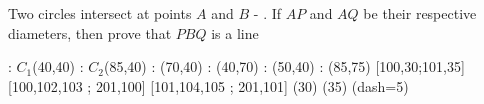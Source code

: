 
%
%
%
%
% 
% 

\question Two circles intersect at points $A$ and $B$ - \asif. If $AP$ and $AQ$ be their 
respective diameters, then prove that $PBQ$ is a line

\insertQR{}

  \begin{marginfigure}
    	: $C_1$(40,40)
    	: $C_2$(85,40)
      : (70,40) %
      : (40,70) %
      : (50,40) %
      : (85,75)
       [100,30;101,35] %
       [100,102,103 ; 201,100] %
       [101,104,105 ; 201,101] %
    \figdrawbegin{}
      (30)
      (35)
      \figdrawline [201,301]
      \figdrawline [201,311]
      \figdrawline [301,311]
      \ifprintanswers
        \figset (dash=5)
        \figdrawline [201,200]
      \fi
    \figdrawend
    \centerline{\box\figBoxA}
  \end{marginfigure} 

